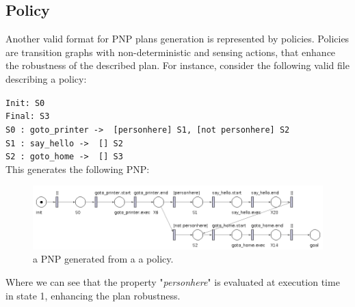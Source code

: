 \documentclass[pdftex,12pt,a4paper]{report}
\begin{document}
\subsection{Policy}
Another valid format for PNP plans generation is represented by policies. Policies are transition graphs with non-deterministic and sensing actions, that enhance the robustness of the described plan.
For instance, consider the following valid file describing a policy:

\noindent\texttt{Init: S0\\
Final: S3\\
S0 : goto\_printer -> { [personhere] S1, [not personhere] S2 } \\
S1 : say\_hello -> { [] S2 } \\
S2 : goto\_home -> { [] S3 }}\\

\noindent This generates the following PNP:
\begin{figure}[H]
	\includegraphics[scale=0.5]{images/SimplePolicy.png}
	\caption{a PNP generated from a a policy.}
\end{figure}
\noindent Where we can see that the property "\textit{personhere}" is evaluated at execution time in state 1, enhancing the plan robustness.
\end{document}
